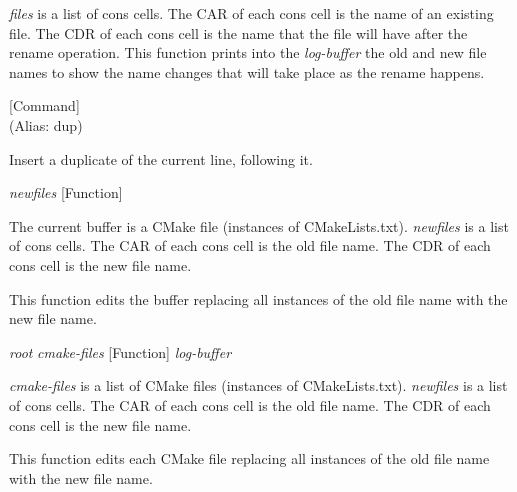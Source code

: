 \begin{doc-string}
\emph{files} is a list of cons cells.  The CAR of each cons cell is the name of an
existing file.  The CDR of each cons cell is the name that the file will have
after the rename operation.  This function prints into the \emph{log-buffer} the old
and new file names to show the name changes that will take place as the rename
happens.
\end{doc-string}

\vspace{1em}
\noindent
{}
\usebox{\funcname}
 \hfill [Command]\\%
 (Alias: dup)

\begin{doc-string}
Insert a duplicate of the current line, following it.
\end{doc-string}

\vspace{1em}
\noindent
{}
\usebox{\funcname}\emph{newfiles}
 \hfill [Function]
\hspace*{\wd\funcname}

\begin{doc-string}
The current buffer is a CMake file (instances of CMakeLists.txt).  \emph{newfiles}
is a list of cons cells.  The CAR of each cons cell is the old file name.  The
CDR of each cons cell is the new file name.

This function edits the buffer replacing all instances of the old file name with
the new file name.
\end{doc-string}

\vspace{1em}
\noindent
{}
\usebox{\funcname}\emph{root} \emph{cmake-files}
 \hfill [Function]
\hspace*{\wd\funcname}\emph{log-buffer}

\begin{doc-string}
\emph{cmake-files} is a list of CMake files (instances of CMakeLists.txt).  \emph{newfiles}
is a list of cons cells.  The CAR of each cons cell is the old file name.  The
CDR of each cons cell is the new file name.

This function edits each CMake file replacing all instances of the old file name
with the new file name.
\end{doc-string}

